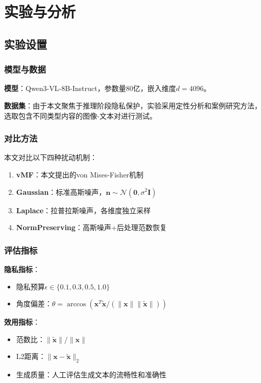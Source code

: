 \documentclass[a4paper,12pt]{article}
\begin{document}
\section{实验与分析}

\subsection{实验设置}

\subsubsection{模型与数据}

\textbf{模型}：Qwen3-VL-8B-Instruct，参数量80亿，嵌入维度$d=4096$。

\textbf{数据集}：由于本文聚焦于推理阶段隐私保护，实验采用定性分析和案例研究方法，选取包含不同类型内容的图像-文本对进行测试。

\subsubsection{对比方法}

本文对比以下四种扰动机制：
\begin{enumerate}
  \item \textbf{vMF}：本文提出的von Mises-Fisher机制
  \item \textbf{Gaussian}：标准高斯噪声，$\mathbf{n} \sim \mathcal{N}(\mathbf{0}, \sigma^2\mathbf{I})$
  \item \textbf{Laplace}：拉普拉斯噪声，各维度独立采样
  \item \textbf{NormPreserving}：高斯噪声+后处理范数恢复
\end{enumerate}

\subsubsection{评估指标}

\textbf{隐私指标}：
\begin{itemize}
  \item 隐私预算$\epsilon \in \{0.1, 0.3, 0.5, 1.0\}$
  \item 角度偏差：$\theta = \arccos(\mathbf{x}^T\tilde{\mathbf{x}} / (\|\mathbf{x}\|\|\tilde{\mathbf{x}}\|))$
\end{itemize}

\textbf{效用指标}：
\begin{itemize}
  \item 范数比：$\|\tilde{\mathbf{x}}\| / \|\mathbf{x}\|$
  \item L2距离：$\|\mathbf{x} - \tilde{\mathbf{x}}\|_2$
  \item 生成质量：人工评估生成文本的流畅性和准确性
\end{itemize}
\end{document}
